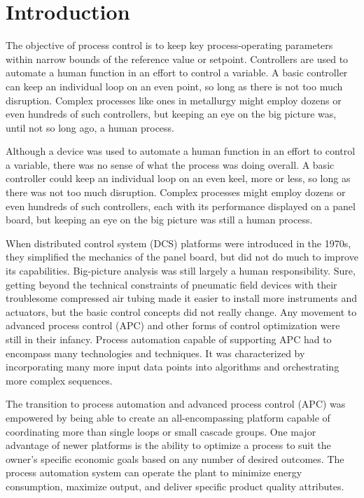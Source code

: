 \section{Introduction}

The objective of process control is to keep key process-operating parameters within narrow bounds of the reference value or setpoint. Controllers are used to automate a human function in an effort to control a variable. A basic controller can keep an individual loop on an even point, so long as there is not too much disruption. Complex processes like ones in metallurgy might employ dozens or even hundreds of such controllers, but keeping an eye on the big picture was, until not so long ago, a human process.

Although a device was used to automate a human function in an effort to control a variable, there was no sense of what the process was doing overall. A basic controller could keep an individual loop on an even keel, more or less, so long as there was not too much disruption. Complex processes might employ dozens or even hundreds of such controllers, each with its performance displayed on a panel board, but keeping an eye on the big picture was still a human process.

When distributed control system (DCS) platforms were introduced in the 1970s, they simplified the mechanics of the panel board, but did not do much to improve its capabilities. Big-picture analysis was still largely a human responsibility. Sure, getting beyond the technical constraints of pneumatic field devices with their troublesome compressed air tubing made it easier to install more instruments and actuators, but the basic control concepts did not really change. Any movement to advanced process control (APC) and other forms of control optimization were still in their infancy. Process automation capable of supporting APC had to encompass many technologies and techniques. It was characterized by incorporating many more input data points into algorithms and orchestrating more complex sequences.

The transition to process automation and advanced process control (APC) was empowered by being able to create an all-encompassing platform capable of coordinating more than single loops or small cascade groups. One major advantage of newer platforms is the ability to optimize a process to suit the owner’s specific economic goals based on any number of desired outcomes. The process automation system can operate the plant to minimize energy consumption, maximize output, and deliver specific product quality attributes.

